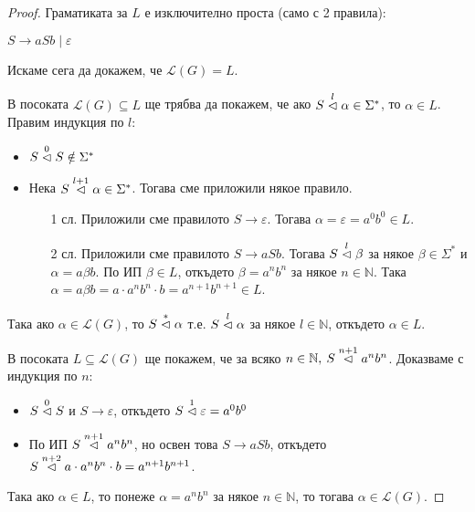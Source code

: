 \begin{proof}
    Граматиката за $L$ е изключително проста (само с 2 правила):
    \begin{center}
        $S \rightarrow aSb \mid \varepsilon$
    \end{center}
    Искаме сега да докажем, че $\mathcal{L}(G) = L$.

    В посоката $\mathcal{L}(G) \subseteq L$ ще трябва да покажем, че ако $S \stackrel{l}{\vartriangleleft} \alpha \in \Sigma^*$, то $\alpha \in L$.
    Правим индукция по $l$:
    \begin{itemize}
        \item $S \stackrel{0}{\vartriangleleft} S \notin \Sigma^*$ \checkmark
        \item Нека $S \stackrel{l + 1}{\vartriangleleft} \alpha \in \Sigma^*$.
              Тогава сме приложили някое правило.
              \begin{itemize}
                  \item[1 сл.] Приложили сме правилото $S \rightarrow \varepsilon$.
                      Тогава $\alpha = \varepsilon = a^0b^0 \in L$.
                  \item[2 сл.] Приложили сме правилото $S \rightarrow aSb$.
                      Тогава $S \stackrel{l}{\vartriangleleft} \beta$ за някое $\beta \in \Sigma^*$ и $\alpha = a \beta b$.
                      По ИП $\beta \in L$, откъдето $\beta = a^nb^n$ за някое $n \in \mathbb{N}$.
                      Така $\alpha = a \beta b = a \cdot a^nb^n \cdot b = a^{n+1}b^{n+1} \in L$.
              \end{itemize}
    \end{itemize}

    Така ако $\alpha \in \mathcal{L}(G)$, то $S \stackrel{*}{\vartriangleleft} \alpha$ т.е. $S \stackrel{l}{\vartriangleleft} \alpha$ за някое $l \in \mathbb{N}$, откъдето $\alpha \in L$.

    В посоката $L \subseteq \mathcal{L}(G)$ ще покажем, че за всяко $n \in \mathbb{N}, \: S \stackrel{n + 1}{\vartriangleleft} a^nb^n$.
    Доказваме с индукция по $n$:
    \begin{itemize}
        \item $S \stackrel{0}{\vartriangleleft} S$ и $S \rightarrow \varepsilon$, откъдето $S \stackrel{1}{\vartriangleleft} \varepsilon = a^0b^0$ \checkmark
        \item По ИП $S \stackrel{n+1}{\vartriangleleft} a^nb^n$, но освен това $S \rightarrow aSb$, откъдето $S \stackrel{n + 2}{\vartriangleleft} a \cdot a^nb^n \cdot b = a^{n + 1}b^{n + 1}$.
    \end{itemize}

    Така ако $\alpha \in L$, то понеже $\alpha = a^nb^n$ за някое $n \in \mathbb{N}$, то тогава $\alpha \in \mathcal{L}(G)$.
\end{proof}

